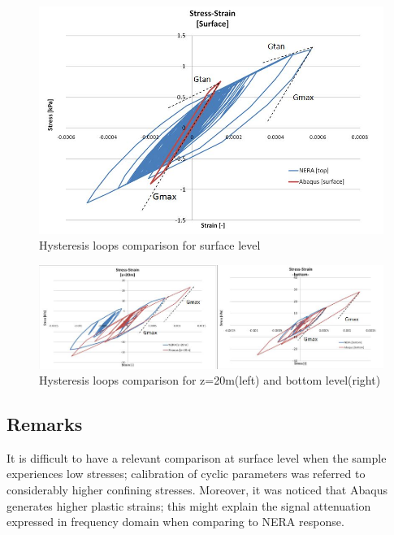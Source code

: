 	\begin{figure}[h!]
		\centering
		\includegraphics[width=0.7\linewidth]{"tau_gamma1"}
		\caption{Hysteresis loops comparison for surface level}
		\label{tau_gamma1}
	\end{figure}
	
	\begin{figure}[h!]
		\centering
		\includegraphics[width=0.7\linewidth]{"tau_gamma2"}
		\caption{Hysteresis loops comparison for z=20m(left) and bottom level(right)}
		\label{tau_gamma2}
	\end{figure}
	
	\subsection{Remarks}
	It is difficult to have a relevant comparison at surface level when the sample experiences low stresses; calibration of cyclic parameters was referred to considerably higher confining stresses. Moreover, it was noticed that Abaqus generates higher plastic strains; this might explain the signal attenuation expressed in frequency domain when comparing to NERA response. 
	
